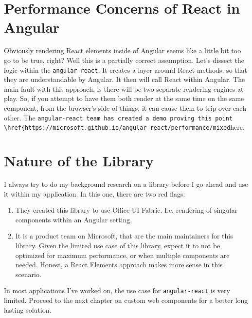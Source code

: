 \section{Performance Concerns of React in Angular}
Obviously rendering React elements inside of Angular seems like a little bit too go to be true, right? Well this is a partially correct assumption. Let's dissect the logic within the \lstinline{angular-react}. It creates a layer around React methods, so that they are understandable by Angular. It then will call React within Angular. The main fault with this approach, is there will be two separate rendering engines at play. So, if you attempt to have them both render at the same time on the same component, from the browser's side of things, it can cause them to trip over each other. The \lstinline{angular-react team has created a demo proving this point \href{https://microsoft.github.io/angular-react/performance/mixed}{here}.

\section{Nature of the Library}
I always try to do my background research on a library before I go ahead and use it within my application. In this one, there are two red flags: 
\begin{enumerate}
  \item They created this library to use Office UI Fabric. I.e. rendering of singular components within an Angular setting. 
  \item It is a product team on Microsoft, that are the main maintainers for this library. Given the limited use case of this library, expect it to not be optimized for maximum performance, or when multiple components are needed. Honest, a React Elements approach makes more sense in this scenario. 
\end{enumerate}

In most applications I've worked on, the use case for \lstinline{angular-react} is very limited. Proceed to the next chapter on custom web components for a better long lasting solution.